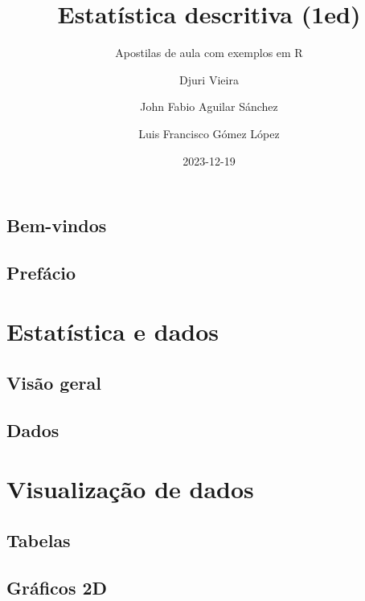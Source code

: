 \documentclass[
  letterpaper,
]{book}
\title{Estatística descritiva (1ed)}
\subtitle{Apostilas de aula com exemplos em R}
\author{Djuri Vieira \and John Fabio Aguilar Sánchez \and Luis Francisco
Gómez López}
\date{2023-12-19}
\renewcommand*\contentsname{Índice}
\newcommand\contentsname{Índice}
\theoremstyle{plain}
\theoremstyle{definition}
\theoremstyle{remark}
\begin{document}
\frontmatter
\maketitle

\renewcommand*\contentsname{Índice}
{
\hypersetup{linkcolor=}
\setcounter{tocdepth}{2}
\tableofcontents
}
\mainmatter
{}

\chapter*{Bem-vindos}\label{bem-vindos}



\chapter*{Prefácio}\label{prefuxe1cio}


\part{Estatística e dados}

\chapter{Visão geral}\label{visuxe3o-geral}

\chapter{Dados}\label{dados}

\part{Visualização de dados}

\chapter{Tabelas}\label{tabelas}

\chapter{Gráficos 2D}\label{gruxe1ficos-2d}
\end{document}
